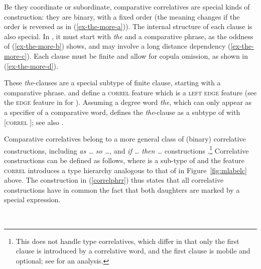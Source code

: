 Be they coordinate or subordinate, comparative correlatives are special kinds of construction: they
are binary, with a fixed order (the meaning changes if the order is reversed as in
(\ref{ex-the-more-a})). The internal structure of each clause is also special. In , it
must start with \emph{the} and a comparative phrase, as the oddness of (\ref{ex-the-more-b}) shows,
and may involve a long distance dependency (\ref{ex-the-more-c}). Each clause must be finite and
allow for copula omission, as shown in (\ref{ex-the-more-d}).

\eal
\label{intell}
\zl

These \emph{the}-clauses  are a special subtype of finite clause, starting with a comparative
phrase. \citet[]{Abeille:Borsley:Espinal:06} and \citet[]{Borsley:11} 
define a \textsc{correl} feature which is a \textsc{left edge} feature (see the \textsc{edge}
feature in \citealt{Bonami:2004} for  ). Assuming a degree word \textit{the}, which can only appear as a specifier of
a comparative word, \citet[]{Borsley:11}  defines the \textit{the}-clause as a subtype of  with [\textsc{correl} ]; see also \citet[]{fgsag08}.

Comparative correlatives belong to a more general class of (binary) correlative constructions, including \emph{as \ldots{} so \ldots{}},
and \emph{if \ldots{} then  \ldots{}} constructions  
\parencites[Section~3.2]{Borsley:04}[--18]{Borsley:11}.\footnote{This does not handle  type correlatives, which differ in that  only the first clause is introduced by a correlative word, and the first clause is mobile and optional; see \citet[228]{pollardsag} for an analysis.}
Correlative constructions can be defined as follows, 
where  is a sub-type of 
 and the feature \textsc{correl} introduces a  type
hierarchy analogous to that of  in Figure~\ref{fig:mlabelc} above.
The construction in (\ref{correlphrr}) thus states that all correlative
constructions have in common the fact that both daughters are marked by a special expression. 

\ea
\label{correlphrr}
 \impl\\
\z

